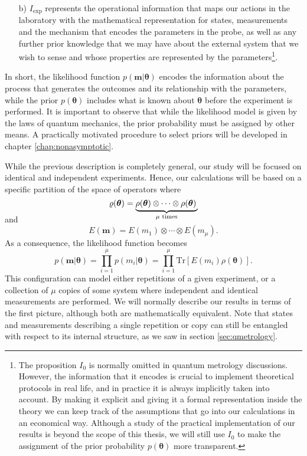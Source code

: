 \begin{itemize}
\begin{itemize}
\item[b)] $I_{\mathrm{exp}}$ represents the operational information that maps our actions in the laboratory with the mathematical representation for states, measurements and the mechanism that encodes the parameters in the probe, as well as any further prior knowledge that we may have about the external system that we wish to sense and whose properties are represented by the parameters\footnote{The proposition $I_0$ is normally omitted in quantum metrology discussions. However, the information that it encodes is crucial to implement theoretical protocols in real life, and in practice it is always implicitly taken into account. By making it explicit and giving it a formal representation inside the theory we can keep track of the assumptions that go into our calculations in an economical way. Although a study of the practical implementation of our results is beyond the scope of this thesis, we will still use $I_0$ to make the assignment of the prior probability $p(\boldsymbol{\theta})$ more transparent.}.
\end{itemize}
\end{itemize}
In short, the likelihood function $p(\boldsymbol{m}|\boldsymbol{\theta})$ encodes the information about the process that generates the outcomes and its relationship with the parameters, while the prior $p(\boldsymbol{\theta})$ includes what is known about $\boldsymbol{\theta}$ before the experiment is performed. It is important to observe that while the likelihood model is given by the laws of quantum mechanics, the prior probability must be assigned by other means. A practically motivated procedure to select priors will be developed in chapter \ref{chap:nonasymptotic}.

While the previous description is completely general, our study will be focused on identical and independent experiments. Hence, our calculations will be based on a specific partition of the space of operators where 
\begin{equation}
\varrho(\boldsymbol{\theta})=\smash[b]{ \underbrace{\rho(\boldsymbol{\theta}) \otimes \cdots \otimes \rho(\boldsymbol{\theta})\,}_\text{$\mu$ times}}
\label{icopies}
\end{equation}
and 
\begin{equation}
E(\boldsymbol{m}) = E(m_1)\otimes \cdots \otimes E(m_\mu).
\label{iidpom}
\end{equation}
As a consequence, the likelihood function becomes
\begin{equation}
p(\boldsymbol{m}|\boldsymbol{\theta}) = \prod_{i=1}^{\mu}p(m_i|\boldsymbol{\theta}) =\prod_{i=1}^{\mu} \mathrm{Tr}\left[E(m_i)\rho(\boldsymbol{\theta})\right].
\label{iidlikelihood}
\end{equation}
This configuration can model either repetitions of a given experiment, or a collection of $\mu$ copies of some system where independent and identical measurements are performed. We will normally describe our results in terms of the first picture, although both are mathematically equivalent. Note that states and measurements describing a single repetition or copy can still be entangled with respect to its internal structure, as we saw in section \ref{sec:qmetrology}. 

